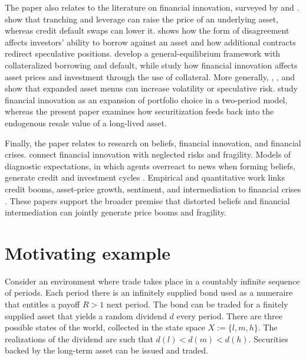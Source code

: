 \documentclass[11pt]{article}
\theoremstyle{plain}
\begin{document}
The paper also relates to the literature on financial innovation, surveyed by \cite{DuffieRahi1995} and \cite{AllenBarbalau2024}. \cite{FostelGeanakoplos2012} show that tranching and leverage can raise the price of an underlying asset, whereas credit default swaps can lower it. \cite{Simsek2013a} shows how the form of disagreement affects investors' ability to borrow against an asset and how additional contracts redirect speculative positions. \cite{GeanakoplosZame2014} develop a general-equilibrium framework with collateralized borrowing and default, while \cite{FostelGeanakoplos2016} study how financial innovation affects asset prices and investment through the use of collateral. More generally, \cite{Brock2009}, \cite{Kubler2012}, and \cite{Simsek2013b} show that expanded asset menus can increase volatility or speculative risk. \cite{IachanNenovSimsek2021} study financial innovation as an expansion of portfolio choice in a two-period model, whereas the present paper examines how securitization feeds back into the endogenous resale value of a long-lived asset.

Finally, the paper relates to research on beliefs, financial innovation, and financial crises. \cite{GennaioliShleiferVishny2012} connect financial innovation with neglected risks and fragility. Models of diagnostic expectations, in which agents overreact to news when forming beliefs, generate credit and investment cycles \citep{BordaloGennaioliShleifer2018, Maxted2024, BordaloGennaioliShleiferTerry2026}. Empirical and quantitative work links credit booms, asset-price growth, sentiment, and intermediation to financial crises \citep{GreenwoodHansonShleiferSorensen2022, KrishnamurthyLi2025}. These papers support the broader premise that distorted beliefs and financial intermediation can jointly generate price booms and fragility.

\section{Motivating example}\label{example}

Consider an environment where trade takes place in a countably infinite sequence of periods. Each period there is an infinitely supplied bond used as a numeraire that entitles a payoff $R>1$ next period. The bond can be traded for a finitely supplied asset that yields a random dividend $d$ every period. There are three possible states of the world, collected in the state space $X:=\{l,m,h\}$. The realizations of the dividend are such that $d(l) < d(m) < d(h)$. Securities backed by the long-term asset can be issued and traded.
\end{document}
